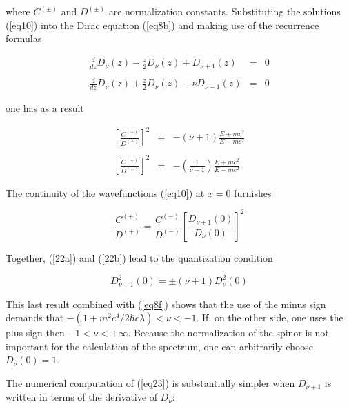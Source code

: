 \documentclass[a4paper,12pt,titlepage]{article}
\begin{document}
\noindent where $C^{\left( \pm \right) }$ and $D^{\left( \pm \right) }$ are
normalization constants. Substituting the solutions (\ref{eq10}) into the
Dirac equation (\ref{eq8b}) and making use of the recurrence formulas

\begin{eqnarray}
\frac{d}{dz}D_{\nu }(z)-\frac{z}{2}D_{\nu }(z)+D_{\nu +1}(z) &=&0  \nonumber
\\
&&  \label{eq22} \\
\frac{d}{dz}D_{\nu }(z)+\frac{z}{2}D_{\nu }(z)-\nu D_{\nu -1}(z) &=&0 
\nonumber
\end{eqnarray}

\noindent one has as a result

\begin{eqnarray}
\left[ \frac{C^{\left( +\right) }}{D^{\left( +\right) }}\right] ^{2}
&=&-\left( \nu +1\right) \frac{E+mc^{2}}{E-mc^{2}}  \nonumber \\
&&  \label{22a} \\
\left[ \frac{C^{\left( -\right) }}{D^{\left( -\right) }}\right] ^{2}
&=&-\left( \frac{1}{\nu +1}\right) \frac{E+mc^{2}}{E-mc^{2}}  \nonumber
\end{eqnarray}

\noindent The continuity of the wavefunctions (\ref{eq10}) at $x=0$ furnishes

\begin{equation}
\frac{C^{\left( +\right) }}{D^{\left( +\right) }}=\frac{C^{\left( -\right) }%
}{D^{\left( -\right) }}\left[ \frac{D_{\nu +1}\left( 0\right) }{D_{\nu
}\left( 0\right) }\right] ^{2}  \label{22b}
\end{equation}

\noindent Together, (\ref{22a}) and (\ref{22b}) lead to the quantization
condition

\begin{equation}
D_{\nu +1}^{2}\left( 0\right) =\pm \left( \nu +1\right) D_{\nu }^{2}\left(
0\right)  \label{eq23}
\end{equation}

\noindent This last result combined with (\ref{eq8f}) \noindent shows that
the use of the minus sign demands that $-\left( 1+m^{2}c^{4}/2\hbar c\lambda
\right) <\nu <-1$. If, on the other side, one uses the plus sign then $%
-1<\nu <+\infty $. Because the normalization of the spinor is not important
for the calculation of the spectrum, one can arbitrarily choose $D_{\nu
}\left( 0\right) =1$.

The numerical computation of (\ref{eq23}) is substantially simpler when $%
D_{\nu +1}$ is written in terms of the derivative of $D_{\nu }$:
\end{document}
